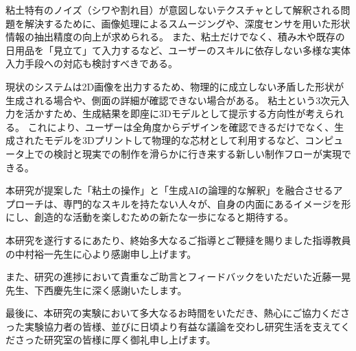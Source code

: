 \documentclass{kuisthesis}
\begin{document}
粘土特有のノイズ（シワや割れ目）が意図しないテクスチャとして解釈される問題を解決するために、画像処理によるスムージングや、深度センサを用いた形状情報の抽出精度の向上が求められる。
また、粘土だけでなく、積み木や既存の日用品を「見立て」て入力するなど、ユーザーのスキルに依存しない多様な実体入力手段への対応も検討すべきである。

現状のシステムは2D画像を出力するため、物理的に成立しない矛盾した形状が生成される場合や、側面の詳細が確認できない場合がある。 
粘土という3次元入力を活かすため、生成結果を即座に3Dモデルとして提示する方向性が考えられる。 
これにより、ユーザーは全角度からデザインを確認できるだけでなく、生成されたモデルを3Dプリントして物理的な芯材として利用するなど、コンピュータ上での検討と現実での制作を滑らかに行き来する新しい制作フローが実現できる。


本研究が提案した「粘土の操作」と「生成AIの論理的な解釈」を融合させるアプローチは、専門的なスキルを持たない人々が、自身の内面にあるイメージを形にし、創造的な活動を楽しむための新たな一歩になると期待する。


\newpage
\acknowledgments
本研究を遂行するにあたり、終始多大なるご指導とご鞭撻を賜りました指導教員の中村裕一先生に心より感謝申し上げます。

また、研究の進捗において貴重なご助言とフィードバックをいただいた近藤一晃先生、下西慶先生に深く感謝いたします。

最後に、本研究の実験において多大なるお時間をいただき、熱心にご協力くださった実験協力者の皆様、並びに日頃より有益な議論を交わし研究生活を支えてくださった研究室の皆様に厚く御礼申し上げます。
%

%
\end{document}
